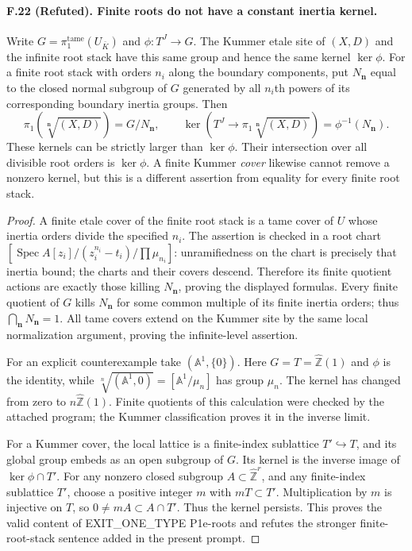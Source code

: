 \paragraph{F.22 (Refuted). Finite roots do
not have a constant inertia kernel.}
Write $G=\pi_1^{\mathrm{tame}}(U_{\bar K})$ and
$\phi:T^J\to G$. The Kummer etale site of $(X,D)$ and the infinite
root stack have this same group and hence the same kernel
$\ker\phi$. For a finite root stack with orders $n_i$ along the
boundary components, put $N_{\mathbf n}$ equal to the closed normal
subgroup of $G$ generated by all $n_i$th powers of its corresponding
boundary inertia groups. Then
\[
 \pi_1(\sqrt[\mathbf n]{(X,D)})=G/N_{\mathbf n},\qquad
 \ker(T^J\to\pi_1\sqrt[\mathbf n]{(X,D)})
       =\phi^{-1}(N_{\mathbf n}).
\]
These kernels can be strictly larger than $\ker\phi$. Their
intersection over all divisible root orders is $\ker\phi$.
A finite Kummer \emph{cover} likewise cannot remove a nonzero kernel,
but this is a different assertion from equality for every finite
root stack.

\begin{proof}
A finite etale cover of the finite root stack is a tame cover of $U$
whose inertia orders divide the specified $n_i$. The assertion is
checked in a root chart $[\operatorname{Spec}A[z_i]/(z_i^{n_i}-t_i)
/\prod\mu_{n_i}]$: unramifiedness on the chart is precisely that
inertia bound; the charts and their covers descend. Therefore its
finite quotient actions are exactly those killing
$N_{\mathbf n}$, proving the displayed formulas. Every finite quotient
of $G$ kills $N_{\mathbf n}$ for some common multiple of its finite
inertia orders; thus $\bigcap_{\mathbf n}N_{\mathbf n}=1$.
All tame covers extend on the Kummer site by the same local
normalization argument, proving the infinite-level assertion.

For an explicit counterexample take $(\mathbb A^1,\{0\})$.
Here $G=T=\widehat{\mathbb Z}(1)$ and $\phi$ is the identity, while
$\sqrt[n]{(\mathbb A^1,0)}=[\mathbb A^1/\mu_n]$ has group $\mu_n$.
The kernel has changed from zero to $n\widehat{\mathbb Z}(1)$.
Finite quotients of this calculation were checked by the attached
program; the Kummer classification proves it in the inverse limit.

For a Kummer cover, the local lattice is a finite-index sublattice
$T'\hookrightarrow T$, and its global group embeds as an open subgroup
of $G$. Its kernel is the inverse image of $\ker\phi\cap T'$.
For any nonzero closed subgroup $A\subset\widehat{\mathbb Z}^{r}$,
and any finite-index sublattice $T'$, choose a positive integer $m$
with $mT\subset T'$. Multiplication by $m$ is injective on $T$, so
$0\ne mA\subset A\cap T'$. Thus the kernel persists. This proves
the valid content of EXIT\_ONE\_TYPE P1e-roots and refutes the stronger
finite-root-stack sentence added in the present prompt.
\end{proof}

